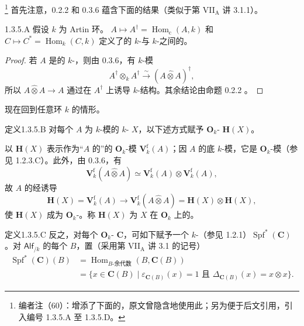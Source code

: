 \footnote{编者注（60）：增添了下面的，原文曾隐含地使用此；另为便于后文引用，引入编号 1.3.5.A 至 1.3.5.D。} 首先注意，0.2.2 和 0.3.6 蕴含下面的结果（类似于第 VII$_{\mathrm A}$ 讲 3.1.1）。
\begin{SGAresult}{}{1.3.5.A}
假设 $k$ 为 Artin 环。 $A\mapsto A^\dagger=\operatorname{Hom}_{\mathrm c}(A,k)$ 和 $C\mapsto C^*=\operatorname{Hom}_k(C,k)$ 定义了的 $k$-与 $k$-之间的。
\end{SGAresult}
\begin{proof}
若 $A$ 是的 $k$-，则由 0.3.6，有 $k$-模
\[
 A^\dagger\otimes_k A^\dagger\xrightarrow{\sim}(A\widehat\otimes A)^\dagger,
\]
所以 $A\widehat\otimes A\to A$ 通过在 $A^\dagger$ 上诱导 $k$-结构。其余结论由命题 0.2.2 。
\end{proof}
现在回到任意环 $k$ 的情形。
\begin{SGAresult}{定义}{1.3.5.B}
对每个 $A$ 为 $k$-模的 $k$- $X$，以下述方式赋予 $\mathbf O_k$- $\mathbf H(X)$。

以 $\mathbf H(X)$ 表示作为“$A$ 的”的 $\mathbf O_k$-模 $\mathbf V_k^{\mathrm f}(A)$；因 $A$ 的底 $k$-模，它是 $\mathbf O_k$-模（参见 1.2.3.C）。此外，由
0.3.6，有
\[
 \mathbf V_k^{\mathrm f}(A\widehat\otimes A)\simeq\mathbf V_k^{\mathrm f}(A)\otimes\mathbf V_k^{\mathrm f}(A),
\]
故 $A$ 的经诱导
\[
 \mathbf H(X)=\mathbf V_k^{\mathrm f}(A)\longrightarrow\mathbf V_k^{\mathrm f}(A\widehat\otimes A)=\mathbf H(X)\otimes\mathbf H(X),
\]
使 $\mathbf H(X)$ 成为 $\mathbf O_k$-。称 $\mathbf H(X)$ 为 $X$ 在 $\mathbf O_k$ 上的。
\end{SGAresult}
\begin{SGAresult}{定义}{1.3.5.C}
反之，对每个 $\mathbf O_k$- $\mathbf C$，可如下赋予一个 $k$-（参见 1.2.1）$\operatorname{Spf}^*(\mathbf C)$。对 $\mathsf{Alf}_{/k}$ 的每个 $B$，置（采用第 VII$_{\mathrm A}$ 讲 3.1 的记号）
\[
\begin{split}
 \operatorname{Spf}^*(\mathbf C)(B)&=\operatorname{Hom}_{B\text{-余代数}}(B,\mathbf C(B))\\
 &=\{x\in\mathbf C(B)\mid\varepsilon_{\mathbf C(B)}(x)=1\text{ 且 }\Delta_{\mathbf C(B)}(x)=x\otimes x\}.
\end{split}\tag{1}
\]
\end{SGAresult}

